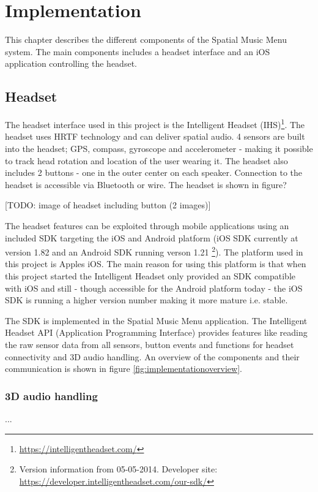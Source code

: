 \chapter{Implementation}
This chapter describes the different components of the Spatial Music Menu system. The main components includes a headset interface and an iOS application controlling the headset.

\section{Headset}
The headset interface used in this project is the Intelligent Headset (IHS)\footnote{\url{https://intelligentheadset.com/}}. The headset uses HRTF technology and can deliver spatial audio. 4 sensors are built into the headset; GPS, compass, gyroscope and accelerometer - making it possible to track head rotation and location of the user wearing it. The headset also includes 2 buttons - one in the outer center on each speaker. Connection to the headset is accessible via Bluetooth or wire. The headset is shown in figure?

[TODO: image of headset including button (2 images)]

The headset features can be exploited through mobile applications using an included SDK targeting the iOS and Android platform (iOS SDK currently at version 1.82 and an Android SDK running verson 1.21 \footnote{Version information from 05-05-2014. Developer site: \url{https://developer.intelligentheadset.com/our-sdk/}}). The platform used in this project is Apples iOS. The main reason for using this platform is that when this project started the Intelligent Headset only provided an SDK compatible with iOS and still - though accessible for the Android platform today - the iOS SDK is running a higher version number making it more mature i.e. stable.

The SDK is implemented in the Spatial Music Menu application. The Intelligent Headset API (Application Programming Interface) provides features like reading the raw sensor data from all sensors, button events and functions for headset connectivity and 3D audio handling. An overview of the components and their communication is shown in figure \ref{fig:implementationoverview}.

\subsection{3D audio handling}
...

